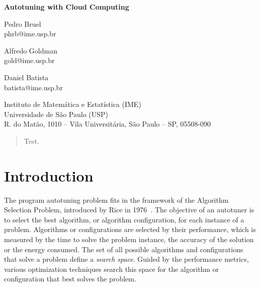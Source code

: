 \documentclass[a4paper, 12pt]{article}
\begin{document}
\hypersetup{backref,pdfpagemode=FullScreen,colorlinks=true}

\thispagestyle{empty}
\begin{center}
    \textbf{\Large{Autotuning with Cloud Computing}}\\

    \vspace*{1cm}

    \begin{minipage}{.3\linewidth}
        \begin{flushleft}
            Pedro Bruel\\
            phrb@ime.usp.br
        \end{flushleft}
    \end{minipage}
    \begin{minipage}{.3\linewidth}
        \begin{center}
            Alfredo Goldman\\
            gold@ime.usp.br
        \end{center}
    \end{minipage}
    \begin{minipage}{.3\linewidth}
        \begin{flushright}
            Daniel Batista\\
            batista@ime.usp.br
        \end{flushright}
    \end{minipage}

    \vskip 1cm

    \normalsize{Instituto de Matemática e Estatística (IME)\\
                Universidade de São Paulo (USP)\\
                R. do Matão, 1010 – Vila Universitária, São Paulo – SP, 05508-090\\}

\end{center}

\begin{abstract}
    Test.
\end{abstract}

\section{Introduction} \label{sec:intro}

The program autotuning problem fits in the framework of the Algorithm Selection
Problem, introduced by Rice in 1976~\cite{rice1976algorithm}. The objective of
an autotuner is to select the best algorithm, or algorithm configuration, for
each instance of a problem.  Algorithms or configurations are selected by their
performance, which is measured by the time to solve the problem instance, the
accuracy of the solution or the energy consumed.  The set of all possible
algorithms and configurations that solve a problem define a \emph{search
space}. Guided by the performance metrics, various optimization techniques
search this space for the algorithm or configuration that best solves the
problem.
\end{document}
